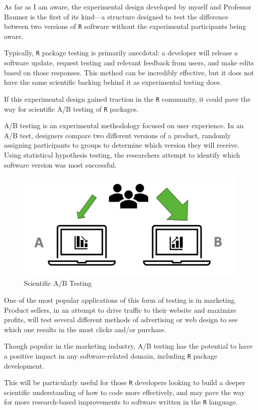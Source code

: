 \documentclass[12pt,twoside]{reedthesis}
\begin{document}
As far as I am aware, the experimental design developed by myself and Professor Baumer is the first of its kind---a structure designed to test the difference between two versions of \texttt{R} software without the experimental participants being aware.

Typically, \texttt{R} package testing is primarily anecdotal: a developer will release a software update, request testing and relevant feedback from users, and make edits based on those responses. This method can be incredibly effective, but it does not have the same scientific backing behind it as experimental testing does.

If this experimental design gained traction in the \texttt{R} community, it could pave the way for scientific A/B testing of \texttt{R} packages.

A/B testing is an experimental methodology focused on user experience. In an A/B test, designers compare two different versions of a product, randomly assigning participants to groups to determine which version they will receive. Using statistical hypothesis testing, the researchers attempt to identify which software version was most successful.
\begin{figure}
\includegraphics[width=1\linewidth]{figure/a-b_testing} \caption{Scientific A/B Testing}\label{fig:unnamed-chunk-86}
\end{figure}
One of the most popular applications of this form of testing is in marketing. Product sellers, in an attempt to drive traffic to their website and maximize profits, will test several different methods of advertising or web design to see which one results in the most clicks and/or purchase.

Though popular in the marketing industry, A/B testing has the potential to have a positive impact in any software-related domain, including \texttt{R} package development.

This will be particularly useful for those \texttt{R} developers looking to build a deeper scientific understanding of how to code more effectively, and may pave the way for more research-based improvements to software written in the \texttt{R} language.
\end{document}
